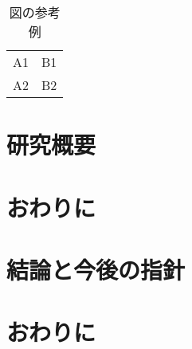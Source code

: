 \documentclass[twocolumn]{preport}
\begin{document}
\begin{table}[tbh]
 \begin{center}
  \begin{tabular}{|l|r|} \hline
  A1 & B1 \\
  A2 & B2 \\ \hline
  \end{tabular}
  \caption{図の参考例}
  \label{table:sample}
 \end{center}
\end{table}

\section{研究概要}
\section{おわりに}
\section{結論と今後の指針}
\section{おわりに}




\end{document}
